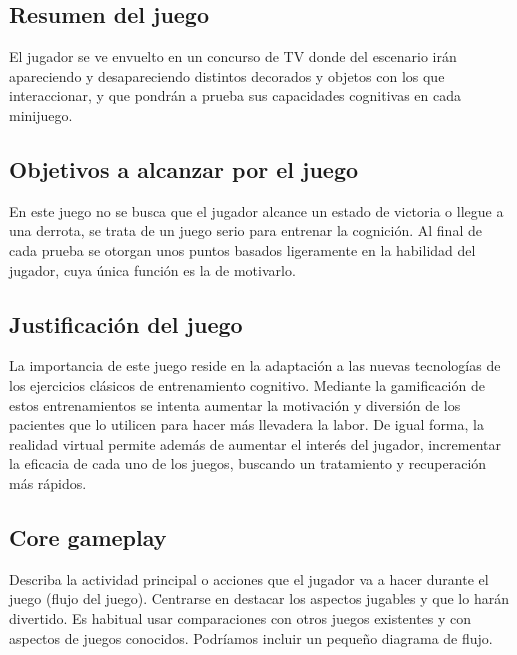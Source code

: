 \subsection{Resumen del juego}


El jugador se ve envuelto en un concurso de TV donde del escenario irán apareciendo y desapareciendo distintos decorados y objetos con los que interaccionar, y que pondrán a prueba sus capacidades cognitivas en cada minijuego. 


\subsection{Objetivos a alcanzar por el juego}

En este juego no se busca que el jugador alcance un estado de victoria o llegue a una derrota, se trata de un juego serio para entrenar la cognición. Al final de cada prueba se otorgan unos puntos basados ligeramente en la habilidad del jugador, cuya única función es la de motivarlo.




\subsection{Justificación del juego}

La importancia de este juego reside en la adaptación a las nuevas tecnologías de los ejercicios clásicos de entrenamiento cognitivo. Mediante la gamificación de estos entrenamientos se intenta aumentar la motivación y diversión de los pacientes que lo utilicen para hacer más llevadera la labor. De igual forma, la realidad virtual permite además de aumentar el interés del jugador, incrementar la eficacia de cada uno de los juegos, buscando un tratamiento y recuperación más rápidos.



\subsection{Core gameplay}
Describa la actividad principal o acciones que el jugador va a hacer durante el juego (flujo del juego). Centrarse en destacar los aspectos jugables y que lo harán divertido. Es habitual usar comparaciones con otros juegos existentes y con aspectos de juegos conocidos. Podríamos incluir un pequeño diagrama de flujo.

